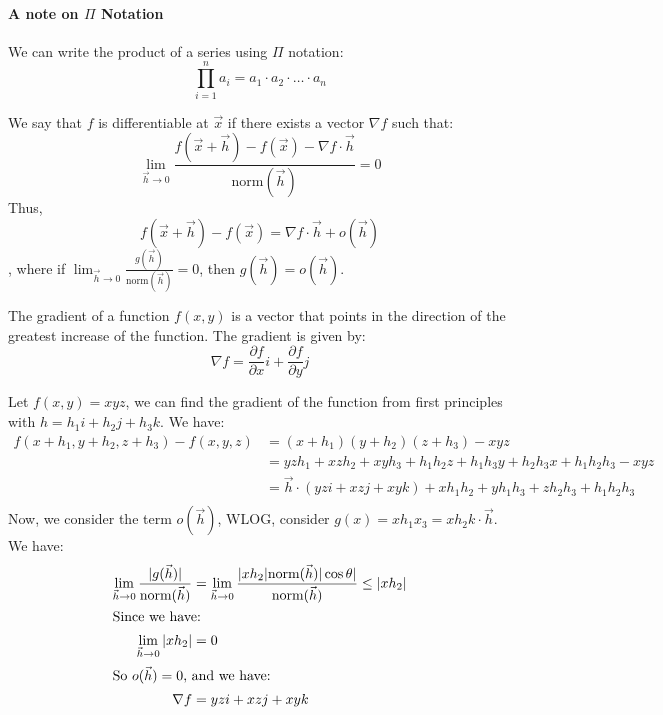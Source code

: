 \documentclass[11pt]{article}
\begin{document}
\paragraph{A note on $\Pi$ Notation} We can write the product of a series using $\Pi$ notation:
\begin{equation}
    \prod_{i=1}^n a_i = a_1 \cdot a_2 \cdot \ldots \cdot a_n
\end{equation}
\begin{definition}[Differentiability]
    We say that $f$ is differentiable at $\vec{x}$ if there exists a vector $\nabla f$ such that:
    \begin{equation}
        \lim_{\vec{h} \to 0} \frac{f(\vec{x} + \vec{h}) - f(\vec{x}) - \nabla f \cdot \vec{h}}{\text{norm}(\vec{h})} = 0
    \end{equation}
    Thus,
    \begin{equation}
        f(\vec{x} + \vec{h}) - f(\vec{x}) = \nabla f \cdot \vec{h} + o(\vec{h})
    \end{equation}
    , where if $\lim_{\vec{h} \to 0} \frac{g(\vec{h})}{\text{norm}(\vec{h})} = 0$, then $g(\vec{h}) = o(\vec{h})$.
\end{definition}
\begin{definition}[Gradient]
    The gradient of a function $f(x, y)$ is a vector that points in the direction of the greatest increase of the function. The gradient is given by:
    \begin{equation}
        \nabla f = \frac{\partial f}{\partial x}i + \frac{\partial f}{\partial y}j
    \end{equation}
\end{definition}
\begin{example}
    Let $f(x, y) = xyz$, we can find the gradient of the function from first principles with $h = h_1i + h_2j + h_3k$. We have:
    \begin{align*}
        f(x+h_1, y+h_2, z+h_3) - f(x, y, z) &= (x+h_1)(y+h_2)(z+h_3) - xyz \\
        &= yzh_1 + xzh_2 + xyh_3 + h_1h_2z + h_1h_3y + h_2h_3x + h_1h_2h_3 - xyz \\
        &= \vec{h} \cdot (yz i + xz j + xy k) + xh_1h_2 + yh_1h_3 + zh_2h_3 + h_1h_2h_3 \\
    \end{align*}
    Now, we consider the term $o(\vec{h})$, WLOG, consider $g(x) =xh_1x_3 = xh_2k\cdot \vec{h}$. We have:
    \begin{align*}
        \lim_{\vec{h} \to 0} \frac{|g(\vec{h})|}{\text{norm}(\vec{h})} &= \lim_{\vec{h} \to 0} \frac{|xh_2|\text{norm}(\vec{h})|\cos \theta|}{\text{norm}(\vec{h})} \le |xh_2| \\ 
        \intertext{Since we have:}
        \lim_{\vec{h} \to 0} |xh_2| &= 0\\
        \intertext{So $o(\vec{h}) = 0$, and we have:}
        \nabla f &= yz i + xz j + xy k
    \end{align*}
\end{example}
\end{document}
